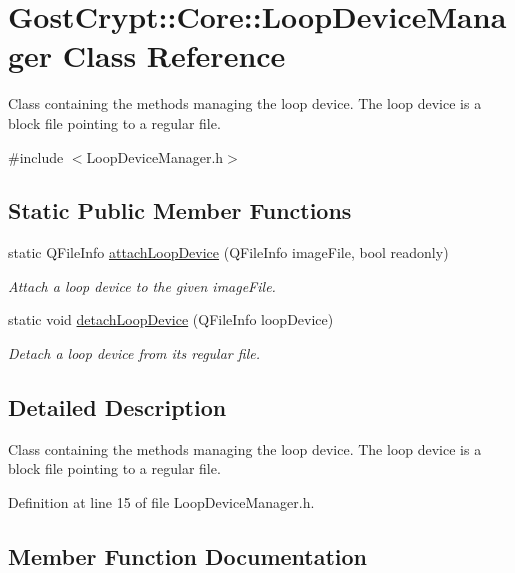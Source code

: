 \hypertarget{class_gost_crypt_1_1_core_1_1_loop_device_manager}{}\section{Gost\+Crypt\+:\+:Core\+:\+:Loop\+Device\+Manager Class Reference}
\label{class_gost_crypt_1_1_core_1_1_loop_device_manager}


Class containing the methods managing the loop device. The loop device is a block file pointing to a regular file.  




{\ttfamily \#include $<$Loop\+Device\+Manager.\+h$>$}

\subsection*{Static Public Member Functions}
\begin{DoxyCompactItemize}
\item 
static Q\+File\+Info \hyperlink{class_gost_crypt_1_1_core_1_1_loop_device_manager_af706ff8b7420c93dfb7e052453a3b914}{attach\+Loop\+Device} (Q\+File\+Info image\+File, bool readonly)
\begin{DoxyCompactList}\small\item\em Attach a loop device to the given image\+File. \end{DoxyCompactList}\item 
static void \hyperlink{class_gost_crypt_1_1_core_1_1_loop_device_manager_a262d179a6f1151eb6fb5b6ecdd1086f3}{detach\+Loop\+Device} (Q\+File\+Info loop\+Device)
\begin{DoxyCompactList}\small\item\em Detach a loop device from its regular file. \end{DoxyCompactList}\end{DoxyCompactItemize}


\subsection{Detailed Description}
Class containing the methods managing the loop device. The loop device is a block file pointing to a regular file. 

Definition at line 15 of file Loop\+Device\+Manager.\+h.



\subsection{Member Function Documentation}
\mbox{\label{class_gost_crypt_1_1_core_1_1_loop_device_manager_af706ff8b7420c93dfb7e052453a3b914}} 
